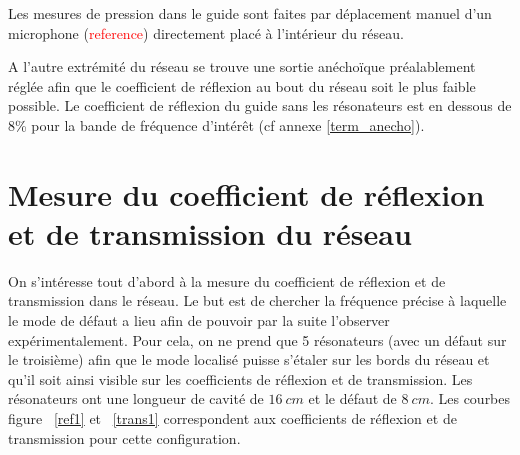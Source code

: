 Les mesures de pression dans le guide sont faites par déplacement manuel d'un microphone (\textcolor{red}{reference}) directement placé à l'intérieur du réseau.




\bigskip

A l'autre extrémité du réseau se trouve une sortie anéchoïque préalablement réglée afin que le coefficient de réflexion au bout du réseau soit le plus faible possible. Le coefficient de réflexion du guide sans les résonateurs est en dessous de 8\% pour la bande de fréquence d'intérêt (cf annexe \ref{term_anecho}).


\section{Mesure du coefficient de réflexion et de transmission du réseau}
On s'intéresse tout d'abord à la mesure du coefficient de réflexion et de transmission dans le réseau. Le but est de chercher la fréquence précise à laquelle le mode de défaut a lieu afin de pouvoir par la suite l'observer expérimentalement. Pour cela, on ne prend que 5 résonateurs (avec un défaut sur le troisième) afin que le mode localisé puisse s'étaler sur les bords du réseau et qu'il soit ainsi visible sur les coefficients de réflexion et de transmission. Les résonateurs ont une longueur de cavité de $16~cm$ et le défaut de $8~cm$. Les courbes figure ~\ref{ref1} et ~\ref{trans1} correspondent aux coefficients de réflexion et de transmission pour cette configuration.

